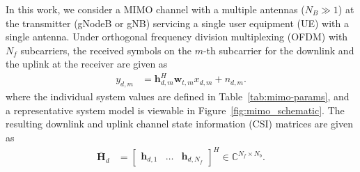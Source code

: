 In this work, we consider a MIMO channel with a multiple antennas ($N_B \gg 1$) at the transmitter (gNodeB or gNB) servicing a single user equipment (UE) with a single antenna. Under orthogonal frequency division multiplexing (OFDM) with $N_f$ subcarriers, the received symbols on the $m$-th subcarrier for the downlink and the uplink at the receiver are given as
\begin{align*}
	y_{d,m} &= \mathbf h_{d,m}^H\mathbf w_{t,m}x_{d,m} + n_{d,m}.
\end{align*}
where the individual system values are defined in Table~\ref{tab:mimo-params}, and a representative system model is viewable in Figure~\ref{fig:mimo_schematic}. The resulting downlink and uplink channel state information (CSI) matrices are given as
\begin{align*} 
	\bar{\mathbf H}_d &= \begin{bmatrix} \mathbf h_{d,1} & \dots & \mathbf h_{d,N_f}\end{bmatrix}^H \in \mathbb C^{N_f \times N_b}.
\end{align*}

